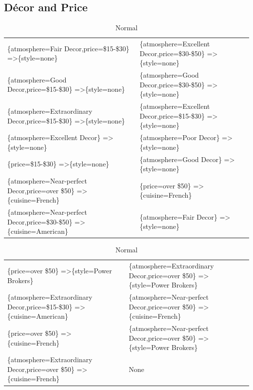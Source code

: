 \documentclass[letterpaper,10pt]{article}
\begin{document}
\begin{appendices}
\subsection*{D\'{e}cor and Price}
\begin{table}[h]
\centering
\caption*{Normal}
\begin{adjustbox}{max width=\textwidth}
\begin{tabular}{ll}
\{atmosphere=Fair Decor,price=\$15-\$30\} =\textgreater \{style=none\} & \{atmosphere=Excellent Decor,price=\$30-\$50\} =\textgreater \{style=none\} \\ 
\{atmosphere=Good Decor,price=\$15-\$30\} =\textgreater \{style=none\} & \{atmosphere=Good Decor,price=\$30-\$50\} =\textgreater \{style=none\} \\ 
\{atmosphere=Extraordinary Decor,price=\$15-\$30\} =\textgreater \{style=none\} & \{atmosphere=Excellent Decor,price=\$15-\$30\} =\textgreater \{style=none\} \\ 
\{atmosphere=Excellent Decor\} =\textgreater \{style=none\} & \{atmosphere=Poor Decor\} =\textgreater \{style=none\} \\ 
\{price=\$15-\$30\} =\textgreater \{style=none\} & \{atmosphere=Good Decor\} =\textgreater \{style=none\} \\ 
\{atmosphere=Near-perfect Decor,price=over \$50\} =\textgreater \{cuisine=French\} & \{price=over \$50\} =\textgreater \{cuisine=French\} \\ 
\{atmosphere=Near-perfect Decor,price=\$30-\$50\} =\textgreater \{cuisine=American\} & \{atmosphere=Fair Decor\} =\textgreater \{style=none\} \\ 

\end{tabular}
\end{adjustbox}
\begin{adjustbox}{max width=\textwidth}
\begin{tabular}{ll}
\{price=over \$50\} =\textgreater \{style=Power Brokers\} & \{atmosphere=Extraordinary Decor,price=over \$50\} =\textgreater \{style=Power Brokers\} \\ 
\{atmosphere=Extraordinary Decor,price=\$15-\$30\} =\textgreater \{cuisine=American\} & \{atmosphere=Near-perfect Decor,price=over \$50\} =\textgreater \{cuisine=French\} \\ 
\{price=over \$50\} =\textgreater \{cuisine=French\} & \{atmosphere=Near-perfect Decor,price=over \$50\} =\textgreater \{style=Power Brokers\} \\ 
\{atmosphere=Extraordinary Decor,price=over \$50\} =\textgreater \{cuisine=French\} & None \\ 
\end{tabular}
\end{adjustbox}


\end{table}
\end{appendices}
\end{document}
